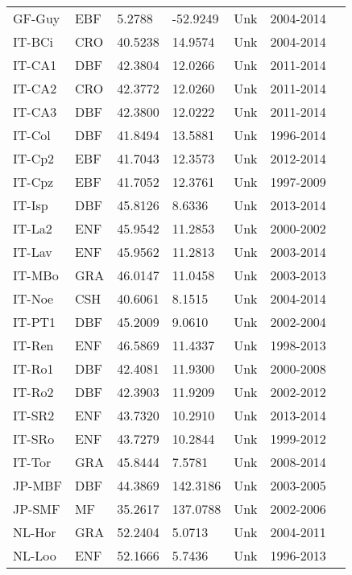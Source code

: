 \documentclass[a4paper, 12pt]{article}
\begin{document}
\begin{longtable}{l l l l l l l}
GF-Guy & EBF & 5.2788 & -52.9249 & Unk & 2004-2014 & \cite{GF-Guy} \\
IT-BCi & CRO & 40.5238 & 14.9574 & Unk & 2004-2014 & \cite{IT-BCi} \\
IT-CA1 & DBF & 42.3804 & 12.0266 & Unk & 2011-2014 & \cite{IT-CA1} \\
IT-CA2 & CRO & 42.3772 & 12.0260 & Unk & 2011-2014 & \cite{IT-CA2} \\
IT-CA3 & DBF & 42.3800 & 12.0222 & Unk & 2011-2014 & \cite{IT-CA3} \\
IT-Col & DBF & 41.8494 & 13.5881 & Unk & 1996-2014 & \cite{IT-Col} \\
IT-Cp2 & EBF & 41.7043 & 12.3573 & Unk & 2012-2014 & \cite{IT-Cp2} \\
IT-Cpz & EBF & 41.7052 & 12.3761 & Unk & 1997-2009 & \cite{IT-Cpz} \\
IT-Isp & DBF & 45.8126 & 8.6336 & Unk & 2013-2014 & \cite{IT-Isp} \\
IT-La2 & ENF & 45.9542 & 11.2853 & Unk & 2000-2002 & \cite{IT-La2} \\
IT-Lav & ENF & 45.9562 & 11.2813 & Unk & 2003-2014 & \cite{IT-Lav} \\
IT-MBo & GRA & 46.0147 & 11.0458 & Unk & 2003-2013 & \cite{IT-MBo} \\
IT-Noe & CSH & 40.6061 & 8.1515 & Unk & 2004-2014 & \cite{IT-Noe} \\
IT-PT1 & DBF & 45.2009 & 9.0610 & Unk & 2002-2004 & \cite{IT-PT1} \\
IT-Ren & ENF & 46.5869 & 11.4337 & Unk & 1998-2013 & \cite{IT-Ren} \\
IT-Ro1 & DBF & 42.4081 & 11.9300 & Unk & 2000-2008 & \cite{IT-Ro1} \\
IT-Ro2 & DBF & 42.3903 & 11.9209 & Unk & 2002-2012 & \cite{IT-Ro2} \\
IT-SR2 & ENF & 43.7320 & 10.2910 & Unk & 2013-2014 & \cite{IT-SR2} \\
IT-SRo & ENF & 43.7279 & 10.2844 & Unk & 1999-2012 & \cite{IT-SRo} \\
IT-Tor & GRA & 45.8444 & 7.5781 & Unk & 2008-2014 & \cite{IT-Tor} \\
JP-MBF & DBF & 44.3869 & 142.3186 & Unk & 2003-2005 & \cite{JP-MBF} \\
JP-SMF & MF & 35.2617 & 137.0788 & Unk & 2002-2006 & \cite{JP-SMF} \\
NL-Hor & GRA & 52.2404 & 5.0713 & Unk & 2004-2011 & \cite{NL-Hor} \\
NL-Loo & ENF & 52.1666 & 5.7436 & Unk & 1996-2013 & \cite{NL-Loo} \\

\end{longtable}
\end{document}

